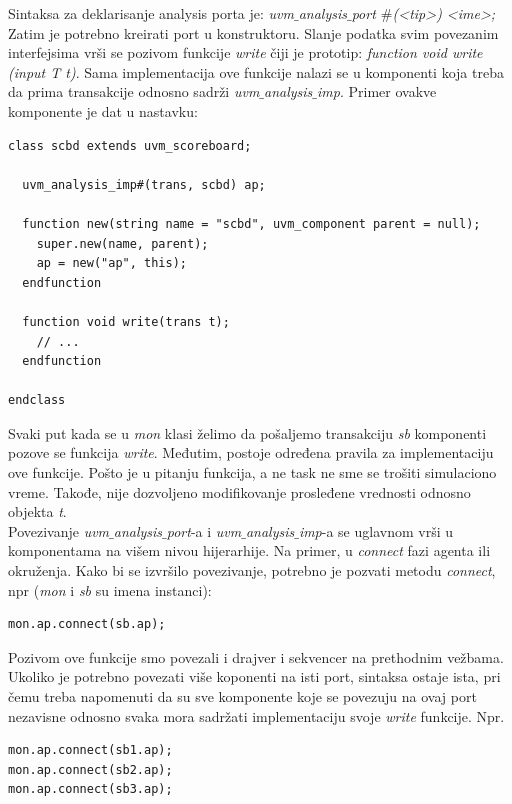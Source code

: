 Sintaksa za deklarisanje analysis porta je: \emph{uvm\(\_\)analysis\(\_\)port
\(\#\)(\textless tip\textgreater ) \textless ime\textgreater ;} Zatim je
potrebno kreirati port u konstruktoru. Slanje podatka svim povezanim
interfejsima vrši se pozivom funkcije \emph{write} čiji je prototip:
\emph{function void write (input T t)}. Sama implementacija ove funkcije nalazi
se u komponenti koja treba da prima transakcije odnosno sadrži
\emph{uvm\(\_\)analysis\(\_\)imp}. Primer ovakve komponente je dat u nastavku:

\begin{lstlisting}
class scbd extends uvm_scoreboard;

  uvm_analysis_imp#(trans, scbd) ap;

  function new(string name = "scbd", uvm_component parent = null);
    super.new(name, parent);
    ap = new("ap", this);
  endfunction

  function void write(trans t);
    // ...
  endfunction

endclass
\end{lstlisting}

Svaki put kada se u \emph{mon} klasi želimo da pošaljemo transakciju \emph{sb}
komponenti pozove se funkcija \emph{write}. Međutim, postoje određena pravila
za implementaciju ove funkcije. Pošto je u pitanju funkcija, a ne task ne sme se
trošiti simulaciono vreme. Takođe, nije dozvoljeno modifikovanje prosleđene
vrednosti odnosno objekta \emph{t}.\\

Povezivanje \emph{uvm\(\_\)analysis\(\_\)port}-a i
\emph{uvm\(\_\)analysis\(\_\)imp}-a se uglavnom vrši u komponentama na višem
nivou hijerarhije. Na primer, u \emph{connect} fazi agenta ili okruženja. Kako
bi se izvršilo povezivanje, potrebno je pozvati metodu \emph{connect}, npr
(\emph{mon} i \emph{sb} su imena instanci):

\begin{lstlisting}
mon.ap.connect(sb.ap);
\end{lstlisting}

Pozivom ove funkcije smo povezali i drajver i sekvencer na prethodnim vežbama.
Ukoliko je potrebno povezati više koponenti na isti port, sintaksa ostaje ista,
pri čemu treba napomenuti da su sve komponente koje se povezuju na ovaj port
nezavisne odnosno svaka mora sadržati implementaciju svoje \emph{write}
funkcije. Npr.

\begin{lstlisting}
mon.ap.connect(sb1.ap);
mon.ap.connect(sb2.ap);
mon.ap.connect(sb3.ap);
\end{lstlisting}

